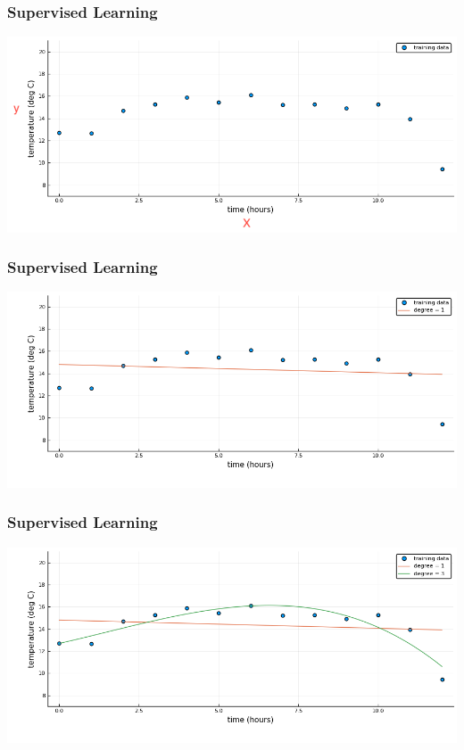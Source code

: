\documentclass[t]{beamer}
\begin{document}
\begin{frame}
  \frametitle{Supervised Learning}
   \begin{center}
    \includegraphics[scale=0.6]{overfitting1.png}
   \end{center}
\end{frame}

\begin{frame}
  \frametitle{Supervised Learning}
   \begin{center}
    \includegraphics[scale=0.6]{overfitting2.png}
   \end{center}
\end{frame}

\begin{frame}
  \frametitle{Supervised Learning}
   \begin{center}
    \includegraphics[scale=0.6]{overfitting3.png}
   \end{center}
\end{frame}
\end{document}
